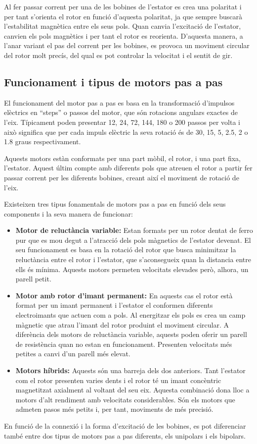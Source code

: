 Al fer passar corrent per una de les bobines de l'estator es crea una polaritat i per tant s'orienta el rotor en funció d'aquesta polaritat, ja que sempre buscarà l'estabilitat magnètica entre els seus pols. Quan canvia l'excitació de l'estator, canvien els pols magnètics i per tant el rotor es reorienta. D'aquesta manera, a l'anar variant el pas del corrent per les bobines, es provoca un moviment circular del rotor molt precís, del qual es pot controlar la velocitat i el sentit de gir. 


\subsection{Funcionament i tipus de motors pas a pas}
El funcionament del motor pas a pas es basa en la transformació d'impulsos elèctrics en “steps” o passos del motor, que són rotacions angulars exactes de l'eix. Típicament poden presentar 12, 24, 72, 144, 180 o 200 passos per volta i això significa que per cada impuls elèctric la seva rotació és de 30, 15, 5, 2.5, 2 o 1.8 graus respectivament. 

Aquests motors estàn conformats per una part mòbil, el rotor, i una part fixa, l'estator. Aquest últim compte amb diferents pols que atreuen el rotor a partir fer passar corrent per les diferents bobines, creant així el moviment de rotació de l'eix.

Existeixen tres tipus fonamentals de motors pas a pas en funció dels seus components i la seva manera de funcionar:

\begin{itemize}
	\item \textbf{Motor de reluctància variable:} Estan formats per un rotor dentat de ferro pur que es mou degut a l'atracció dels pols màgnetics de l'estator devenat. El seu funcionament es basa en la rotació del rotor que busca minimitzar la reluctància entre el rotor i l'estator, que s'aconsegueix quan la distancia entre ells és mínima. Aquests motors permeten velocitats elevades però, alhora, un parell petit. 
	
	\item \textbf{Motor amb rotor d'imant permanent:} En aquests cas el rotor està format per un imant permanent i l'estator el conformen diferents electroimants que actuen com a pols. Al energitzar els pols es crea un camp màgnetic que atrau l'imant del rotor produint el moviment circular. A diferència dels motors de reluctància variable, aquests poden oferir un parell de resistència quan no estan en funcionament. Presenten velocitats més petites a canvi d'un parell més elevat. 
	
	\item \textbf{Motors híbrids:} Aquests són una barreja dels dos anteriors. Tant l'estator com el rotor presenten varies dents i el rotor té un imant concèntric magnetitzat axialment al voltant del seu eix. Aquesta combinació dona lloc a motors d'alt rendiment amb velocitats considerables. Són els motors que admeten pasos més petits i, per tant, moviments de més precisió. 
\end{itemize}
En funció de la connexió i la forma d'excitació de les  bobines, es pot diferenciar també entre dos tipus de motors pas a pas diferents, els unipolars i els bipolars.

